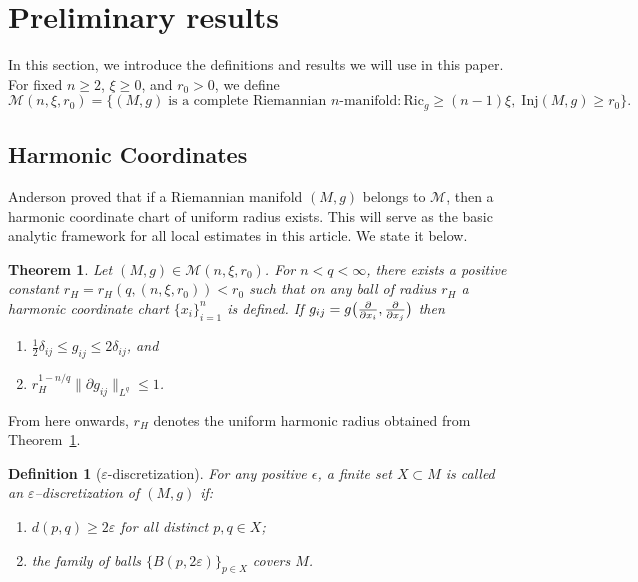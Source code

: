 \documentclass[10 pt, reqno]{amsart}
\newtheorem{theorem}{Theorem}[section]
\newtheorem{defn}{Definition}[section]
\begin{document}
\section{Preliminary results} \label{prelim}
In this section, we introduce the definitions and results we will use in this paper. For fixed $n\ge 2$, $\xi\ge 0$, and $r_0>0$, we define
\[
\mathcal{M}(n,\xi,r_0)
=\{(M,g)\;\text{is a complete Riemannian $n$-manifold}:  \mathrm{Ric}_g \ge (n-1)\xi,\; \mathrm{Inj}(M,g)\ge r_0\}.
\]
\subsection{Harmonic Coordinates} \label{sec:TheClass}

Anderson proved that if a 
Riemannian manifold $(M,g)$ belongs to $\mathcal{M}$, then a harmonic coordinate chart of uniform radius exists. This will serve as the basic analytic framework for all local estimates in this article. We state it below.

\begin{theorem}{\cite{CheegerAnderson,Hebey}}
\label{thm:harmonic_radius}
Let $(M,g)\in \mathcal{M}(n,\xi,r_0)$. For $n<q<\infty$, there exists a positive constant $r_H=r_H(q, (n,\xi,r_0))<r_0$ such that on any ball of radius $r_H$  a harmonic coordinate chart $\{x_i\}_{i=1}^n$ is defined. If $g_{ij}=g\big{(}\frac{\partial}{\partial x_i},\frac{\partial}{\partial x_j}\big{)}$  then
\begin{enumerate}
    \item $\frac{1}{2}\delta_{ij}\leq g_{ij}\leq 2\delta_{ij}$, and
    \item $r_H^{1-n/q}\|\partial g_{ij}\|_{L^q}\leq 1$.
\end{enumerate}
\end{theorem}

From here onwards, $r_H$ denotes the uniform harmonic radius obtained from
Theorem~\ref{thm:harmonic_radius}.
\begin{defn}[$\varepsilon$-discretization] \label{defn:epsilondiscretization} For any positive $\epsilon$, a finite set $X\subset M$ is called an \emph{$\varepsilon$--discretization} of $(M,g)$ if:
\begin{enumerate}
    \item $d(p,q)\ge 2\varepsilon$ for all distinct $p,q\in X$;
    \item the family of balls $\{B(p,2\varepsilon)\}_{p\in X}$ covers $M$.
\end{enumerate}

\end{defn}
\end{document}
